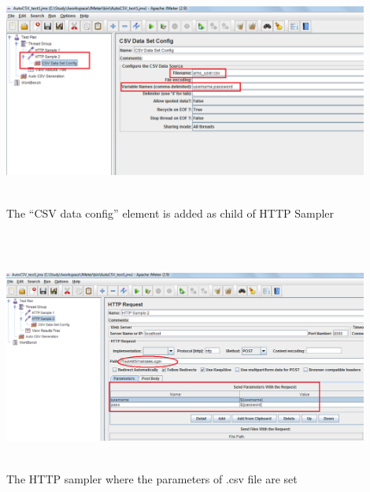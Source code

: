 \documentclass[12pt]{beamer}
\begin{document}
\subsection{}
\begin{frame}[c]
\includegraphics[width=12cm, height=7.5cm]{images/testplancsv.png}
\\The “CSV data config” element is added as child of HTTP Sampler
\end{frame}

\subsection{}
\begin{frame}[c]
\includegraphics[width=12cm, height=7.5cm]{images/testplancsv2.png}
\\The HTTP sampler where the parameters of .csv file are set
\end{frame}
\end{document}

